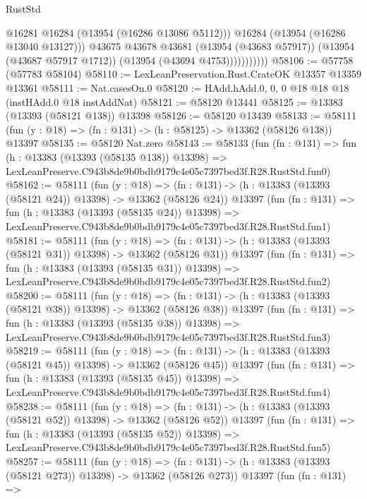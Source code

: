 \begin{lexlean}{RustStd}
\begin{coremodule}
                          @16281
                          @16284
                          (@13954 (@16286 @13086 @5112)))
                        @16284
                        (@13954 (@16286 @13040 @13127)))
                      @43675
                      @43678
                      @43681
                      (@13954 (@43683 @57917))
                      (@13954 (@43687 @57917 @1712))
                      (@13954 (@43694 @4753)))))))))))
@58106 := @57758 (@57783 @58104)
@58110 := LexLeanPreservation.Rust.CrateOK @13357 @13359 @13361
@58111 := Nat.casesOn.{0}
@58120 := HAdd.hAdd.{0, 0, 0} @18 @18 @18 (instHAdd.{0} @18 instAddNat)
@58121 := @58120 @13441
@58125 := @13383 (@13393 (@58121 @138)) @13398
@58126 := @58120 @13439
@58133 := @58111 (fun (y : @18) => (fn : @131) -> (h : @58125) -> @13362 (@58126 @138)) @13397
@58135 := @58120 Nat.zero
@58143 := @58133
    (fun (fn : @131) =>
    fun (h : @13383 (@13393 (@58135 @138)) @13398) =>
    LexLeanPreserve.C943b8de9b0bdb9179c4e05c7397bed3f.R28.RustStd.fun0)
@58162 := @58111
    (fun (y : @18) =>
    (fn : @131) -> (h : @13383 (@13393 (@58121 @24)) @13398) -> @13362 (@58126 @24))
    @13397
    (fun (fn : @131) =>
    fun (h : @13383 (@13393 (@58135 @24)) @13398) =>
    LexLeanPreserve.C943b8de9b0bdb9179c4e05c7397bed3f.R28.RustStd.fun1)
@58181 := @58111
    (fun (y : @18) =>
    (fn : @131) -> (h : @13383 (@13393 (@58121 @31)) @13398) -> @13362 (@58126 @31))
    @13397
    (fun (fn : @131) =>
    fun (h : @13383 (@13393 (@58135 @31)) @13398) =>
    LexLeanPreserve.C943b8de9b0bdb9179c4e05c7397bed3f.R28.RustStd.fun2)
@58200 := @58111
    (fun (y : @18) =>
    (fn : @131) -> (h : @13383 (@13393 (@58121 @38)) @13398) -> @13362 (@58126 @38))
    @13397
    (fun (fn : @131) =>
    fun (h : @13383 (@13393 (@58135 @38)) @13398) =>
    LexLeanPreserve.C943b8de9b0bdb9179c4e05c7397bed3f.R28.RustStd.fun3)
@58219 := @58111
    (fun (y : @18) =>
    (fn : @131) -> (h : @13383 (@13393 (@58121 @45)) @13398) -> @13362 (@58126 @45))
    @13397
    (fun (fn : @131) =>
    fun (h : @13383 (@13393 (@58135 @45)) @13398) =>
    LexLeanPreserve.C943b8de9b0bdb9179c4e05c7397bed3f.R28.RustStd.fun4)
@58238 := @58111
    (fun (y : @18) =>
    (fn : @131) -> (h : @13383 (@13393 (@58121 @52)) @13398) -> @13362 (@58126 @52))
    @13397
    (fun (fn : @131) =>
    fun (h : @13383 (@13393 (@58135 @52)) @13398) =>
    LexLeanPreserve.C943b8de9b0bdb9179c4e05c7397bed3f.R28.RustStd.fun5)
@58257 := @58111
    (fun (y : @18) =>
    (fn : @131) -> (h : @13383 (@13393 (@58121 @273)) @13398) -> @13362 (@58126 @273))
    @13397
    (fun (fn : @131) =>

\end{coremodule}
\end{lexlean}
